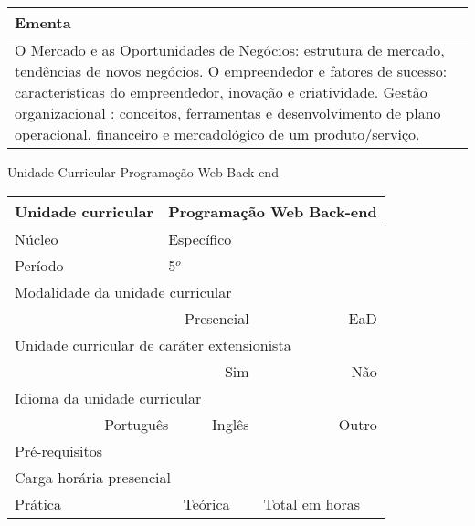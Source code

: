 \begin{quadro}[ht!]
\begin{tabular}{|p{3cm} p{2cm} p{3cm} p{2cm} p{3cm} p{2cm}|}
\multicolumn{6}{|p{15cm}|}{\cellcolor{blue1} Ementa} \\\hline
\hline\multicolumn{6}{|p{15cm}|}{\scriptsize O Mercado e as Oportunidades de Negócios: estrutura de mercado, tendências de novos negócios. O empreendedor e fatores de sucesso: características do empreendedor, inovação e criatividade. Gestão organizacional : conceitos, ferramentas e desenvolvimento de plano operacional, financeiro e mercadológico de um produto/serviço. }\\\hline 
\hline
	\end{tabular}
\end{quadro}


\begin{quadro}[ht!]
  \centering\scriptsize
\caption{Unidade Curricular Programação Web Back-end}
\label{unit_23}
\begin{tabular}{|p{3cm} p{2cm} p{3cm} p{2cm} p{3cm} p{2cm}|}\hline
\multicolumn{1}{|p{3cm}|}{\cellcolor{blue1} Unidade curricular} & \multicolumn{5}{p{9cm}|}{Programação Web Back-end}\\\hline
\multicolumn{1}{|p{3cm}|}{\cellcolor{blue1} Núcleo} & \multicolumn{5}{p{11.5cm}|}{Específico}\\\hline
\multicolumn{1}{|p{3cm}|}{\cellcolor{blue1} Período} & \multicolumn{5}{p{9cm}|}{5$^o$}\\\hline
\multicolumn{6}{|p{15cm}|}{\cellcolor{blue1} Modalidade da unidade curricular} \\\hline
\multicolumn{2}{|r}{		} &  \multicolumn{2}{r}{Presencial \XBox} & \multicolumn{2}{r|}{EaD \Square	} \\\hline
\multicolumn{6}{|p{15cm}|}{\cellcolor{blue1} Unidade curricular de caráter extensionista} \\\hline
\multicolumn{4}{|r}{			Sim \Square	} & \multicolumn{2}{r|}{	Não \XBox	}\\\hline
\multicolumn{6}{|p{15cm}|}{\cellcolor{blue1} Idioma da unidade curricular} \\ \hline
\multicolumn{2}{|r}{	Português \XBox	} &  \multicolumn{2}{r}{	Inglês \Square	} & \multicolumn{2}{r|}{	Outro \Square	} \\ \hline
\multicolumn{1}{|p{3cm}|}{\cellcolor{blue1} Pré-requisitos} & \multicolumn{5}{p{9cm}|}{}\\ \hline
\multicolumn{6}{|p{15cm}|}{\cellcolor{blue1} Carga horária presencial} \\ \hline
\multicolumn{1}{|p{3cm}|}{\raggedleft Prática} & \multicolumn{1}{p{1cm}|}{\centering	30	} &  \multicolumn{1}{p{3cm}|}{\raggedleft Teórica}  & \multicolumn{1}{p{1cm}|}{\centering 	30	} & \multicolumn{1}{p{3cm}|}{\raggedleft Total em horas} & \multicolumn{1}{p{1cm}|}{\raggedleft	60	} \\ \hline 

\end{tabular}
\end{quadro}
